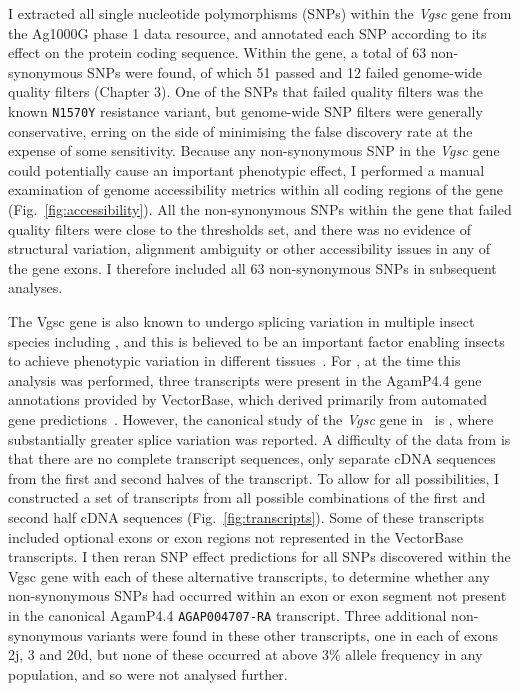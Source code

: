 \documentclass[a4paper,11pt,abstracton,hidelinks]{scrartcl}
\begin{document}
I extracted all single nucleotide polymorphisms (SNPs) within the \textit{Vgsc} gene from the Ag1000G phase 1 data resource, and annotated each SNP according to its effect on the protein coding sequence.
%
Within the gene, a total of 63 non-synonymous SNPs were found, of which 51 passed and 12 failed genome-wide quality filters (Chapter 3).
%
One of the SNPs that failed quality filters was the known \texttt{N1570Y} resistance variant, but genome-wide SNP filters were generally conservative, erring on the side of minimising the false discovery rate at the expense of some sensitivity.
%
Because any non-synonymous SNP in the \textit{Vgsc} gene could potentially cause an important phenotypic effect, I performed a manual examination of genome accessibility metrics within all coding regions of the gene (Fig.~\ref{fig:accessibility}).
%
All the non-synonymous SNPs within the gene that failed quality filters were close to the thresholds set, and there was no evidence of structural variation, alignment ambiguity or other accessibility issues in any of the gene exons.
%
I therefore included all 63 non-synonymous SNPs in subsequent analyses.


The Vgsc gene is also known to undergo splicing variation in multiple insect species including \agam, and this is believed to be an important factor enabling insects to achieve phenotypic variation in different tissues~\parencite{Dong2014,Davies2007}.
%
For \agam, at the time this analysis was performed, three transcripts were present in the AgamP4.4 gene annotations provided by VectorBase, which derived primarily from automated gene predictions~\parencite{Curwen2004}.
%
However, the canonical study of the \textit{Vgsc} gene in \agam\ is \textcite{Davies2007}, where substantially greater splice variation was reported.
%
A difficulty of the data from \textcite{Davies2007} is that there are no complete transcript sequences, only separate cDNA sequences from the first and second halves of the transcript.
%
To allow for all possibilities, I constructed a set of transcripts from all possible combinations of the first and second half cDNA sequences (Fig.~\ref{fig:transcripts}).
%
Some of these transcripts included optional exons or exon regions not represented in the VectorBase transcripts.
%
I then reran SNP effect predictions for all SNPs discovered within the Vgsc gene with each of these alternative transcripts, to determine whether any non-synonymous SNPs had occurred within an exon or exon segment not present in the canonical AgamP4.4 \texttt{AGAP004707-RA} transcript.
%
Three additional non-synonymous variants were found in these other transcripts, one in each of exons 2j, 3 and 20d, but none of these occurred at above 3\% allele frequency in any population, and so were not analysed further.
\end{document}
